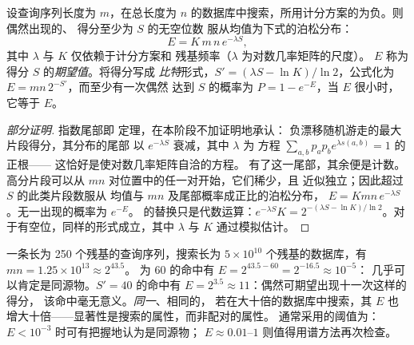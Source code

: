 \begin{theorem}[随机命中的统计]\label{thm:b3:bioinformatics:evalue}
设查询序列长度为 $m$，在总长度为
$n$ 的数据库中搜索，所用计分方案的为负。则偶然出现的、
得分至少为 $S$ 的无空位数
服从均值为下式的泊松分布：
\[
E = K\,m\,n\,e^{-\lambda S},
\]
其中 $\lambda$ 与 $K$ 仅依赖于计分方案和
残基频率（$\lambda$ 为对数几率矩阵的尺度）。
$E$ 称为得分 $S$ 的\emph{期望值}。将得分写成
\emph{比特}形式，$S' = (\lambda S - \ln K)/\ln 2$，公式化为
$E = m n\, 2^{-S'}$，而至少有一次偶然
达到 $S$ 的概率为 $P = 1 - e^{-E}$，当 $E$
很小时，它等于 $E$。
\end{theorem}
\begin{proof}[部分证明]
指数尾部即  定理，在本阶段不加证明地承认：
负漂移随机游走的最大片段得分，其分布的尾部
以 $e^{-\lambda S}$ 衰减，其中 $\lambda$ 为
方程 $\sum_{a,b} p_{a} p_{b} e^{\lambda s(a,b)} = 1$ 的正根——
这恰好是使对数几率矩阵自洽的方程。
有了这一尾部，其余便是计数。高分片段可以从
$mn$ 对位置中的任一对开始，它们稀少，且
近似独立；因此超过 $S$ 的此类片段数服从
均值与 $mn$ 及尾部概率成正比的泊松分布，
$E = Kmn\,e^{-\lambda S}$。无一出现的概率为 $e^{-E}$。
的替换只是代数运算：$e^{-\lambda S} K = 2^{-(\lambda S -
\ln K)/\ln 2}$。对于有空位，同样的形式成立，其中 $\lambda$
与 $K$ 通过模拟估计。
\end{proof}

\begin{example}[读取 E 值]\label{ex:b3:bioinformatics:evalue}
一条长为 \num{250} 个残基的查询序列，搜索长为 $5\times 10^{10}$
个残基的数据库，有 $mn = 1.25\times 10^{13} \approx 2^{43.5}$。
为 $60$ 的命中有 $E = 2^{43.5 - 60} = 2^{-16.5} \approx 10^{-5}$：
几乎可以肯定是同源物。$S' = 40$ 的命中有 $E = 2^{3.5}
\approx 11$：偶然可期望出现十一次这样的得分，
该命中毫无意义。\emph{同一}、相同的，
若在大十倍的数据库中搜索，其 $E$ 也
增大十倍——显著性是搜索的属性，而非配对的属性。
通常采用的阈值为：$E < 10^{-3}$ 时可有把握地认为是同源物；
$E \approx 0.01$--$1$ 则值得用谱方法再次检查。
\end{example}

